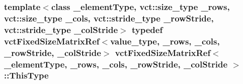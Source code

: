 \hypertarget{classvct_fixed_size_matrix_ref_a29a621c8e22f250f9033e539ad219f95}{
\subsubsection[{This\-Type}]{\setlength{\rightskip}{0pt plus 5cm}template$<$class \-\_\-element\-Type, vct\-::size\-\_\-type \-\_\-rows, vct\-::size\-\_\-type \-\_\-cols, vct\-::stride\-\_\-type \-\_\-row\-Stride, vct\-::stride\-\_\-type \-\_\-col\-Stride$>$ typedef {\bf vct\-Fixed\-Size\-Matrix\-Ref}$<$value\-\_\-type, \-\_\-rows, \-\_\-cols, \-\_\-row\-Stride, \-\_\-col\-Stride$>$ {\bf vct\-Fixed\-Size\-Matrix\-Ref}$<$ \-\_\-element\-Type, \-\_\-rows, \-\_\-cols, \-\_\-row\-Stride, \-\_\-col\-Stride $>$\-::{\bf This\-Type}}}\label{classvct_fixed_size_matrix_ref_a29a621c8e22f250f9033e539ad219f95}


